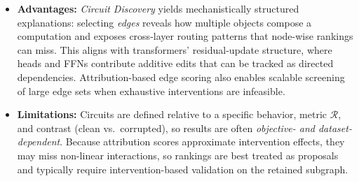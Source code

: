 \documentclass[11pt,letterpaper]{mystyle}
\begin{document}
\begin{itemize}[leftmargin=*]
    \item \textbf{Advantages:}
    \textit{Circuit Discovery} yields mechanistically structured explanations: selecting \emph{edges} reveals how multiple objects compose a computation and exposes cross-layer routing patterns that node-wise rankings can miss.
    This aligns with transformers’ residual-update structure, where heads and FFNs contribute additive edits that can be tracked as directed dependencies.
    Attribution-based edge scoring also enables scalable screening of large edge sets when exhaustive interventions are infeasible.

    \item \textbf{Limitations:}
    Circuits are defined relative to a specific behavior, metric $\mathcal{R}$, and contrast (clean vs.\ corrupted), so results are often \textit{objective- and dataset-dependent}.
    Because attribution scores approximate intervention effects, they may miss non-linear interactions, so rankings are best treated as proposals and typically require intervention-based validation on the retained subgraph.
\end{itemize}



\end{document}
